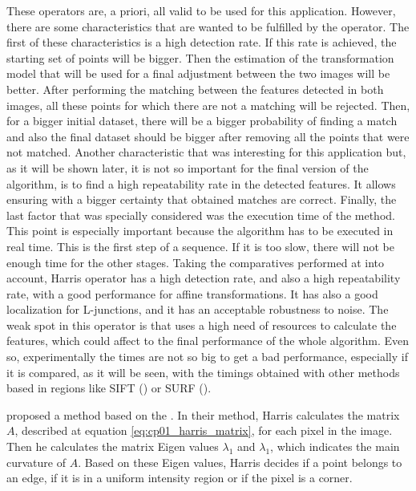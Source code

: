 These operators are, a priori, all valid to be used for this application. However, there are some characteristics that are wanted to be fulfilled by the operator. The first of these characteristics is a high detection rate. If this rate is achieved, the starting set of points will be bigger. Then the estimation of the transformation model that will be used for a final adjustment between the two images will be better. After performing the matching between the features detected in both images, all these points for which there are not a matching will be rejected. Then, for a bigger initial dataset, there will be a bigger probability of finding a match and also the final dataset should be bigger after removing all the points that were not matched. Another characteristic that was interesting for this application but, as it will be shown later, it is not so important for the final version of the algorithm, is to find a high repeatability rate in the detected features. It allows ensuring with a bigger certainty that obtained matches are correct. Finally, the last factor that was specially considered was the execution time of the method. This point is especially important because the algorithm has to be executed in real time. This is the first step of a sequence. If it is too slow, there will not be enough time for the other stages. Taking the comparatives performed at \cite{mohanna2001performance, zheng1999analysis} into account, Harris operator has a high detection rate, and also a high repeatability rate, with a good performance for affine transformations. It has also a good localization for L-junctions, and it has an acceptable robustness to noise. The weak spot in this operator is that uses a high need of resources to calculate the features, which could affect to the final performance of the whole algorithm. Even so, experimentally the times are not so big to get a bad performance, especially if it is compared, as it will be seen, with the timings obtained with other methods based in regions like SIFT (\cite{lowe1999object}) or SURF (\cite{bay2008speeded}).

\cite{shi1994good} proposed a method based on the \cite{harris1988combined}. In their method, Harris calculates the matrix $A$, described at equation \ref{eq:cp01_harris_matrix}, for each pixel in the image. Then he calculates the matrix Eigen values $\lambda_1$ and $\lambda_1$, which indicates the main curvature of $A$. Based on these Eigen values, Harris decides if a point belongs to an edge, if it is in a uniform intensity region or if the pixel is a corner.


